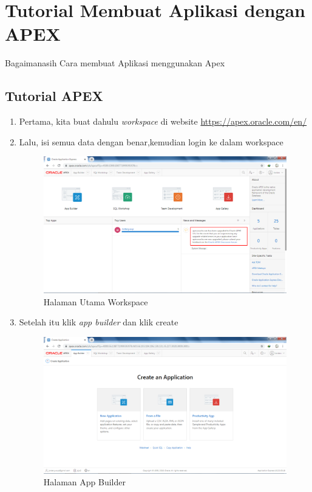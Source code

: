\chapter{Tutorial Membuat Aplikasi dengan APEX}
Bagaimanasih Cara membuat Aplikasi menggunakan Apex

\section{Tutorial APEX}

\begin{enumerate}
\item Pertama, kita buat dahulu \textit{workspace} di website \url{https://apex.oracle.com/en/} 

\item Lalu, isi semua data dengan benar,kemudian login ke dalam workspace 
\begin{figure}[H]
\centering
\caption{Halaman Utama Workspace}
\includegraphics[width=1\textwidth]{figures/1.png}
\end{figure}

\item Setelah itu klik \textit{app builder} dan klik create  
\begin{figure}[H]
\centering
\caption{Halaman App Builder}
\includegraphics[width=1\textwidth]{figures/2.png}
\end{figure}


\end{enumerate}
